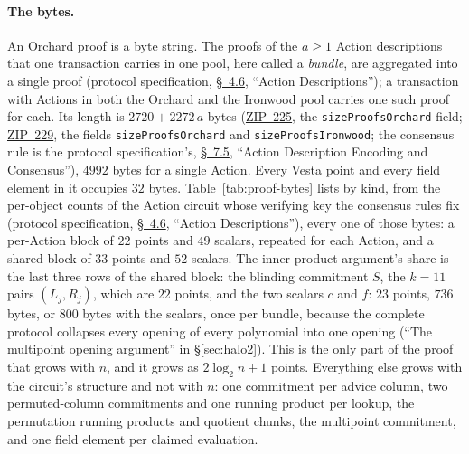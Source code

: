 \documentclass[11pt,a4paper]{article}
\theoremstyle{definition}
\begin{document}
\paragraph{The bytes.}
An Orchard proof is a byte string. The proofs of the $a \ge 1$ Action
descriptions that one transaction carries in one pool, here called a
\emph{bundle}, are aggregated into a single proof (protocol specification,
\href{https://zips.z.cash/protocol/nu6_3.pdf\#actiondesc}{\S~4.6},
``Action Descriptions''); a transaction with Actions in both the Orchard
and the Ironwood pool carries one such proof for each. Its length is
$2720 + 2272\,a$ bytes (\href{https://zips.z.cash/zip-0225}{ZIP~225},
the \texttt{sizeProofsOrchard} field;
\href{https://zips.z.cash/zip-0229}{ZIP~229}, the fields
\texttt{sizeProofsOrchard} and \texttt{sizeProofsIronwood}; the
consensus rule is the protocol
specification's,
\href{https://zips.z.cash/protocol/nu6_3.pdf\#actionencodingandconsensus}%
{\S~7.5},
``Action Description Encoding and Consensus''), $4992$ bytes for a single
Action. Every Vesta point and every field element in it occupies $32$
bytes. Table~\ref{tab:proof-bytes} lists by kind, from the per-object
counts of the Action circuit whose verifying key the consensus rules fix
(protocol specification,
\href{https://zips.z.cash/protocol/protocol.pdf\#actiondesc}{\S~4.6},
``Action Descriptions''), every one of those bytes: a per-Action block of $22$
points and $49$ scalars, repeated for each Action, and a shared block of
$33$ points and $52$ scalars. The inner-product argument's share is the
last three rows of the shared block: the blinding commitment $S$, the
$k = 11$ pairs $(L_j, R_j)$, which are $22$ points, and the two scalars
$c$ and $f$: $23$ points, $736$ bytes, or $800$ bytes with the scalars,
once per bundle, because the complete protocol collapses every opening of
every polynomial into one opening (``The multipoint opening argument'' in
\S\ref{sec:halo2}). This is the only part of the proof that grows with
$n$, and it grows as $2\log_2 n + 1$ points.
Everything else grows with the circuit's structure and not with $n$:
one commitment per advice column, two permuted-column commitments and
one running product per lookup, the permutation running products and
quotient chunks, the multipoint commitment, and one field element per
claimed evaluation.
\end{document}
